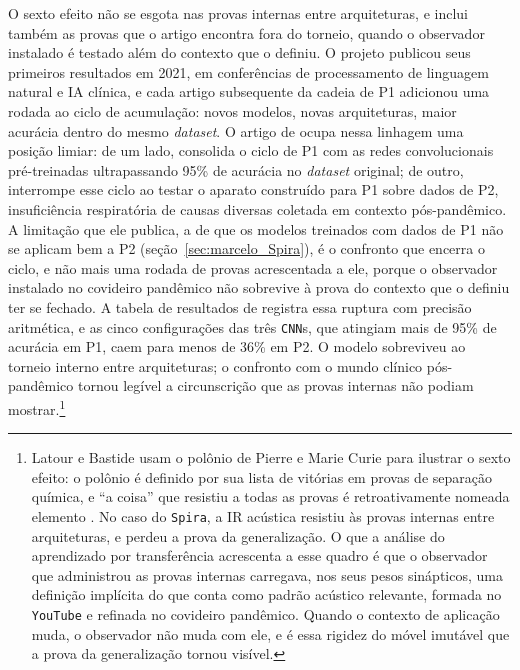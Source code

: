 O sexto efeito não se esgota nas provas internas entre arquiteturas, e inclui também as provas que o artigo encontra fora do torneio, quando o observador instalado é testado além do contexto que o definiu. O projeto publicou seus primeiros resultados em 2021, em conferências de processamento de linguagem natural e IA clínica, e cada artigo subsequente da cadeia de P1 adicionou uma rodada ao ciclo de acumulação: novos modelos, novas arquiteturas, maior acurácia dentro do mesmo \textit{dataset}. O artigo de \textcite{Gauy2024Discriminant} ocupa nessa linhagem uma posição limiar: de um lado, consolida o ciclo de P1 com as redes convolucionais pré-treinadas ultrapassando 95\% de acurácia no \textit{dataset} original; de outro, interrompe esse ciclo ao testar o aparato construído para P1 sobre dados de P2, insuficiência respiratória de causas diversas coletada em contexto pós-pandêmico. A limitação que ele publica, a de que os modelos treinados com dados de P1 não se aplicam bem a P2 (seção~\ref{sec:marcelo_Spira}), é o confronto que encerra o ciclo, e não mais uma rodada de provas acrescentada a ele, porque o observador instalado no covideiro pandêmico não sobrevive à prova do contexto que o definiu ter se fechado. A tabela de resultados de \textcite{Gauy2024Discriminant} registra essa ruptura com precisão aritmética, e as cinco configurações das três \texttt{CNN}s, que atingiam mais de 95\% de acurácia em P1, caem para menos de 36\% em P2. O modelo sobreviveu ao torneio interno entre arquiteturas; o confronto com o mundo clínico pós-pandêmico tornou legível a circunscrição que as provas internas não podiam mostrar.\footnote{Latour e Bastide usam o polônio de Pierre e Marie Curie para ilustrar o sexto efeito: o polônio é definido por sua lista de vitórias em provas de separação química, e \enquote{a coisa} que resistiu a todas as provas é retroativamente nomeada elemento \parencite[pp.~63--65]{Latour1986Writing}. No caso do \texttt{Spira}, a IR acústica resistiu às provas internas entre arquiteturas, e perdeu a prova da generalização. O que a análise do aprendizado por transferência acrescenta a esse quadro é que o observador que administrou as provas internas carregava, nos seus pesos sinápticos, uma definição implícita do que conta como padrão acústico relevante, formada no \texttt{YouTube} e refinada no covideiro pandêmico. Quando o contexto de aplicação muda, o observador não muda com ele, e é essa rigidez do móvel imutável que a prova da generalização tornou visível.}

